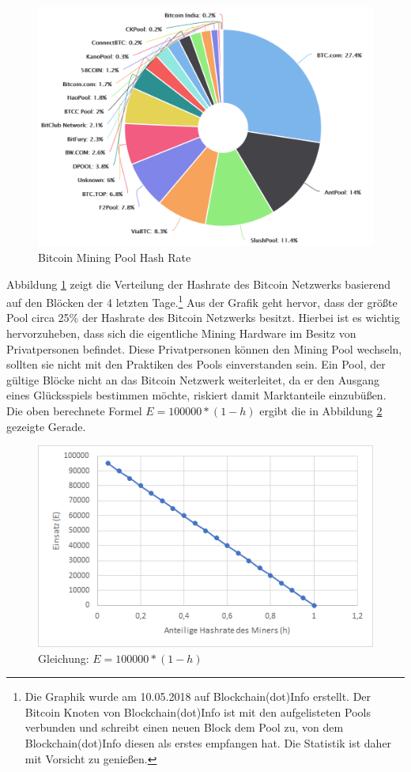 \begin{figure}[H]
\centering
\includegraphics[width=1\linewidth]{Figures/btc_mining_pools}
\decoRule
\caption{Bitcoin Mining Pool Hash Rate \cite{blockchain_info_pools}}
\label{fig:btc_mining_pools}
\end{figure}

Abbildung \ref{fig:btc_mining_pools} zeigt die Verteilung der Hashrate des Bitcoin Netzwerks basierend auf den Blöcken der 4 letzten Tage.\footnote{Die Graphik wurde am 10.05.2018 auf Blockchain(dot)Info erstellt. Der Bitcoin Knoten von Blockchain(dot)Info ist mit den aufgelisteten Pools verbunden und schreibt einen neuen Block dem Pool zu, von dem Blockchain(dot)Info diesen als erstes empfangen hat. Die Statistik ist daher mit Vorsicht zu genießen.} Aus der Grafik geht hervor, dass der größte Pool circa 25\% der Hashrate des Bitcoin Netzwerks besitzt. Hierbei ist es wichtig hervorzuheben, dass sich die eigentliche Mining Hardware im Besitz von Privatpersonen befindet. Diese Privatpersonen können den Mining Pool wechseln, sollten sie nicht mit den Praktiken des Pools einverstanden sein. Ein Pool, der gültige Blöcke nicht an das Bitcoin Netzwerk weiterleitet, da er den Ausgang eines Glücksspiels bestimmen möchte, riskiert damit Marktanteile einzubüßen.
\newpage
\noindent
Die oben berechnete Formel $E = 100000 * (1-h)$ ergibt die in Abbildung \ref{fig:eH} gezeigte Gerade.

\begin{figure}[H]
\centering
\includegraphics[scale=0.88]{Figures/hE}
\decoRule
\caption{Gleichung: $E = 100000 * (1-h)$}
\label{fig:eH}
\end{figure}

